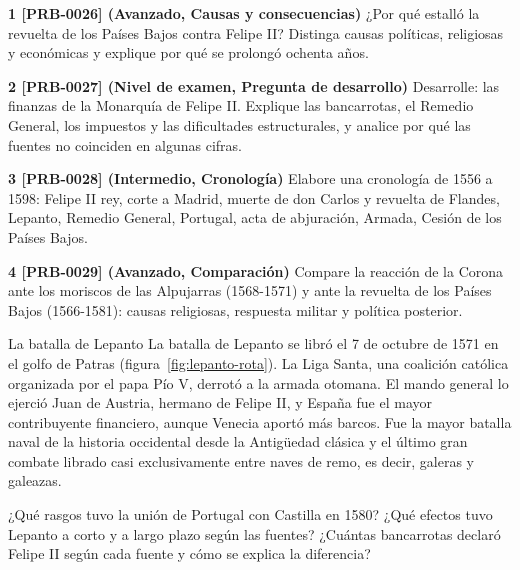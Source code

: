 \documentclass{book}
\begin{document}
\begin{tcolorbox}[title={Ejercicios}, studiumworked, breakable]

\noindent\textbf{1 [PRB-0026] (Avanzado, Causas y consecuencias)}
¿Por qué estalló la revuelta de los Países Bajos contra Felipe II? Distinga causas políticas, religiosas y económicas y explique por qué se prolongó ochenta años.


\noindent\textbf{2 [PRB-0027] (Nivel de examen, Pregunta de desarrollo)}
Desarrolle: las finanzas de la Monarquía de Felipe II. Explique las bancarrotas, el Remedio General, los impuestos y las dificultades estructurales, y analice por qué las fuentes no coinciden en algunas cifras.


\noindent\textbf{3 [PRB-0028] (Intermedio, Cronología)}
Elabore una cronología de 1556 a 1598: Felipe II rey, corte a Madrid, muerte de don Carlos y revuelta de Flandes, Lepanto, Remedio General, Portugal, acta de abjuración, Armada, Cesión de los Países Bajos.


\noindent\textbf{4 [PRB-0029] (Avanzado, Comparación)}
Compare la reacción de la Corona ante los moriscos de las Alpujarras (1568-1571) y ante la revuelta de los Países Bajos (1566-1581): causas religiosas, respuesta militar y política posterior.

\end{tcolorbox}

\begin{tcolorbox}[title={Autoficha}, studiumcheck, breakable]

La batalla de Lepanto
La batalla de Lepanto se libró el 7 de octubre de 1571 en el golfo de Patras (figura~\ref{fig:lepanto-rota}). La Liga Santa, una coalición católica organizada por el papa Pío V, derrotó a la armada otomana. El mando general lo ejerció Juan de Austria, hermano de Felipe II, y España fue el mayor contribuyente financiero, aunque Venecia aportó más barcos. Fue la mayor batalla naval de la historia occidental desde la Antigüedad clásica y el último gran combate librado casi exclusivamente entre naves de remo, es decir, galeras y galeazas.


¿Qué rasgos tuvo la unión de Portugal con Castilla en 1580? ¿Qué efectos tuvo Lepanto a corto y a largo plazo según las fuentes? ¿Cuántas bancarrotas declaró Felipe II según cada fuente y cómo se explica la diferencia?

\end{tcolorbox}
\end{document}
